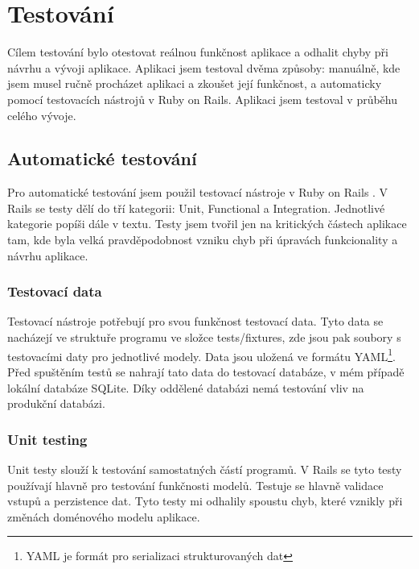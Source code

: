\chapter{Testování}

Cílem testování bylo otestovat reálnou funkčnost aplikace a odhalit chyby při návrhu a vývoji aplikace. Aplikaci jsem testoval dvěma způsoby: manuálně, kde jsem musel ručně procházet aplikaci a zkoušet její funkčnost, a automaticky pomocí testovacích nástrojů v Ruby on Rails. Aplikaci jsem testoval v průběhu celého vývoje. 

\section{Automatické testování}
Pro automatické testování jsem použil testovací nástroje v Ruby on Rails \cite{RoR_testing}. V Rails se testy dělí do tří kategorii: Unit, Functional a Integration. Jednotlivé kategorie popíši dále v textu. Testy jsem tvořil jen na kritických částech aplikace tam,  kde byla velká pravděpodobnost vzniku chyb při úpravách funkcionality a návrhu aplikace.


\subsection{Testovací data}
Testovací nástroje potřebují pro svou funkčnost testovací data. Tyto data se nacházejí ve struktuře programu ve složce tests/fixtures, zde jsou pak soubory s testovacími daty pro jednotlivé modely. Data jsou uložená ve formátu YAML\footnote{YAML je formát pro serializaci strukturovaných dat}. Před spuštěním testů se nahrají tato data do testovací databáze, v mém případě lokální databáze SQLite. Díky oddělené databázi nemá testování vliv na produkční databázi.

\subsection{Unit testing}
Unit testy slouží k testování samostatných částí programů. V Rails se tyto testy používají hlavně pro testování funkčnosti modelů. Testuje se hlavně validace vstupů a perzistence dat. Tyto testy mi odhalily spoustu chyb, které vznikly při změnách doménového modelu aplikace.

